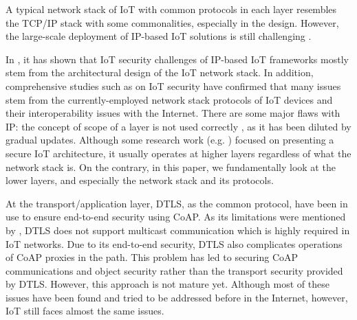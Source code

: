 \documentclass{ieeeaccess}
\begin{document}
A typical network stack of IoT with common protocols in each layer resembles the TCP/IP stack with some commonalities, especially in the design. However, the large-scale deployment of IP-based IoT solutions is still challenging \cite{amadeo2016information}. 

In \cite{ramezanifarkhani2018securing}, it has shown that IoT security challenges of IP-based IoT frameworks mostly stem from the architectural design of the IoT network stack. In addition, comprehensive studies such as \cite{yang2017survey} on IoT security have confirmed that many issues stem from the currently-employed network stack protocols of IoT devices and their interoperability issues with the Internet. There are some major flaws with IP: the concept of scope of a layer is not used correctly \cite{day2008networking}, as it has been diluted by gradual updates. Although some research work (e.g. \cite{suarez2016secure}) focused on presenting a secure IoT architecture, it usually operates at higher layers regardless of what the network stack is. On the contrary, in this paper, we fundamentally look at the lower layers, and especially the network stack and its protocols.

At the transport/application layer, DTLS, as the common protocol, have been in use to ensure end-to-end security using CoAP. As its limitations were mentioned by \cite{grammatikis2019securing,7005393}, DTLS does not support multicast communication which is highly required in IoT networks. Due to its end-to-end security, DTLS also complicates operations of CoAP proxies in the path. This problem has led to securing CoAP communications and object security rather than the transport security provided by DTLS. However, this approach is not mature yet.
Although most of these issues have been found and tried to be addressed before in the Internet, however, IoT still faces almost the same issues.
\end{document}
